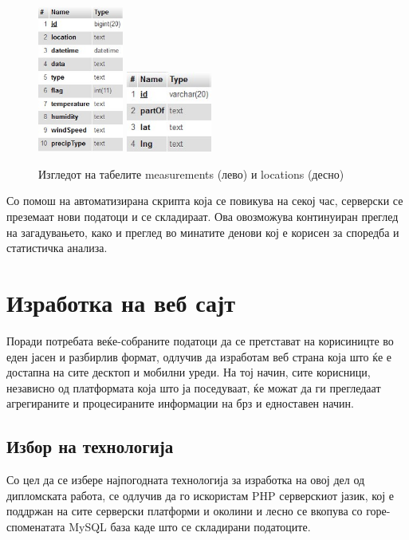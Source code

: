\documentclass{uvamscse}
\begin{document}
\begin{figure}[H]
 \centering
  \includegraphics[width=0.25\textwidth]{figures/measurementbase.jpg}
  \hspace{5mm}
  \includegraphics[width=0.25\textwidth]{figures/locationsbase.jpg}
  \caption{Изгледот на табелите measurements (лево) и locations (десно)}
  \label{fig:bases}
\end{figure}

Со помош на автоматизирана скрипта која се повикува на секој час, серверски се преземаат нови податоци и се складираат. Ова овозможува континуиран преглед на загадувањето, како и преглед во минатите денови кој е корисен за споредба и статистичка анализа.
\vspace{5mm}

\chapter{Изработка на веб сајт}
Поради потребата веќе-собраните податоци да се претстават на корисиницте во еден јасен и разбирлив формат, одлучив да изработам веб страна која што ќе е достапна на сите десктоп и мобилни уреди. На тој начин, сите корисници, независно од платформата која што ја поседуваат, ќе можат да ги прегледаат агрегираните и процесираните информации на брз и едноставен начин.
\section{Избор на технологија}
Со цел да се избере најпогодната технологија за изработка на овој дел од дипломската работа, се одлучив да го искористам PHP серверскиот јазик, кој е поддржан на сите серверски платформи и околини и лесно се вкопува со горе-споменатата MySQL база каде што се складирани податоците.
\end{document}
